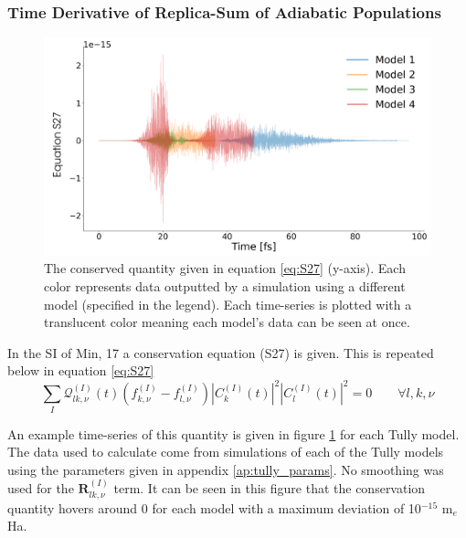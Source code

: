 \subsubsection{Time Derivative of Replica-Sum of Adiabatic Populations}
\begin{figure}[ht]
	\includegraphics[width=\textwidth]{../img/CTMQC/TullyModels/CTMQC_S27.png}
	\caption{\label{fig:S27}The conserved quantity given in equation \eqref{eq:S27} (y-axis). Each color represents data outputted by a simulation using a different model (specified in the legend). Each time-series is plotted with a translucent color meaning each model's data can be seen at once.}
\end{figure}

\noindent In the SI of Min, 17 \cite{min_ab_2017} a conservation equation (S27) is given. This is repeated below in equation \eqref{eq:S27}
\begin{equation}
	\sum_{I} \mathcal{Q}_{lk, \nu}^{(I)}(t) \left( f_{k, \nu}^{(I)} - f_{l, \nu}^{(I)} \right) |C_{k}^{(I)} (t)|^2 |C_{l}^{(I)} (t)|^2 = 0  \qquad \forall l, k, \nu
	\label{eq:S27}
\end{equation}

An example time-series of this quantity is given in figure \ref{fig:S27} for each Tully model. The data used to calculate come from simulations of each of the Tully models using the parameters given in appendix \ref{ap:tully_params}. No smoothing was used for the $\mathbf{R}_{lk, \nu}^{(I)}$ term. It can be seen in this figure that the conservation quantity hovers around 0 for each model with a maximum deviation of 10$^{-15}$ m$_{e}$Ha.


